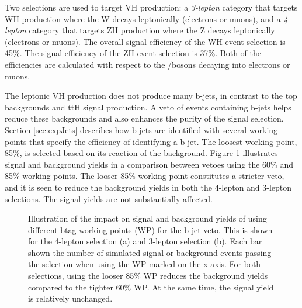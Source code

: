 Two selections are used to target VH production: a \emph{3-lepton} category that targets WH production where the W decays leptonically (electrons or muons), and a \emph{4-lepton} category that targets ZH production where the Z decays leptonically (electrons or muons).
The overall signal efficiency of the WH event selection is 45\%.
The signal efficiency of the ZH event selection is 37\%.
Both of the efficiencies are calculated with respect to the \W/\Z bosons decaying into electrons or muons.

The leptonic VH production does not produce many b-jets, in contrast to the top backgrounds and ttH signal production.
A veto of events containing b-jets helps reduce these backgrounds and also enhances the purity of the signal selection.
Section \ref{sec:expJets} describes how b-jets are identified with several working points that specify the efficiency of identifying a b-jet.
The loosest working point, 85\%, is selected based on its reaction of the background.
Figure \ref{fig:hmmBveto} illustrates signal and background yields in a comparison between vetoes using the 60\% and 85\% working points.
The looser 85\% working point constitutes a stricter veto, and it is seen to reduce the background yields in both the 4-lepton and 3-lepton selections.
The signal yields are not substantially affected.


\begin{figure}[h!]
\captionsetup[subfigure]{position=b}
\centering
{}
\caption{Illustration of the impact on signal and background yields of using different btag working points (WP) for the b-jet veto. This is shown for the 4-lepton selection (a) and 3-lepton selection (b). Each bar shown the number of simulated signal or background events passing the selection when using the WP marked on the x-axis. For both selections, using the looser 85\% WP reduces the background yields compared to the tighter 60\% WP. At the same time, the signal yield is relatively unchanged.}
\label{fig:hmmBveto}
\end{figure}

